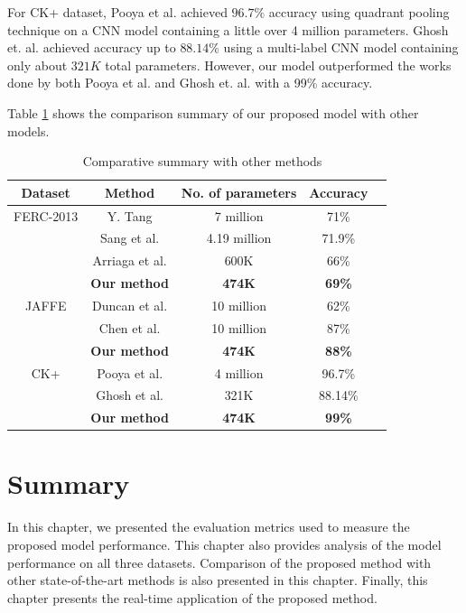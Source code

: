 \documentclass[master]{thesis-uestc}
\begin{document}
For CK+ dataset, Pooya et al.\cite{do_deep_7406361} achieved $96.7\%$ accuracy using quadrant pooling technique on a CNN model containing a little over 4 million parameters. Ghosh et. al. \cite{Ghosh_7344632} achieved accuracy up to $88.14\%$ using a multi-label CNN model containing only about $321K$ total parameters. However, our model outperformed the works done by both Pooya et al.\cite{do_deep_7406361} and Ghosh et. al. \cite{Ghosh_7344632} with a 99\% accuracy.

Table \ref{table_comparison} shows the comparison summary of our proposed model with other models. 

\begin{table}[ht]
\renewcommand{\arraystretch}{1.3}
\caption{\,\,\,\,\,Comparative summary with other methods}
\label{table_comparison}
\begin{center}
\begin{tabular}{|c|c|c|c|c|}
\hline
Dataset & Method & No. of parameters & Accuracy \\ \hline
FERC-2013 & Y. Tang\cite{tang2018} & 7 million & 71\% \\
                 & Sang et al.\cite{sang-2017} & 4.19 million & 71.9\% \\
	      & Arriaga et al.\cite{DBLP:journals/corr/abs-1710-07557} & 600K & 66\% \\
	      & \textbf{Our method} & \textbf{474K} & \textbf{69\%} \\
\hline
JAFFE & Duncan et al.\cite{duncan2016} & 10 million & 62\% \\
                 & Chen et al.\cite{7988558} & 10 million & 87\% \\
	      & \textbf{Our method} & \textbf{474K} & \textbf{88\%} \\
\hline
CK+ & Pooya et al.\cite{do_deep_7406361} & 4 million & 96.7\% \\
                 & Ghosh et al.\cite{Ghosh_7344632} & 321K & 88.14\% \\
	      & \textbf{Our method} & \textbf{474K} & \textbf{99\%} \\
\hline
\end{tabular}
\end{center}
\end{table}

\section{Summary}
In this chapter, we presented the evaluation metrics used to measure the proposed model performance. This chapter also provides analysis of the model performance on all three datasets. Comparison of the proposed method with other state-of-the-art methods is also presented in this chapter. Finally, this chapter presents the real-time application of the proposed method. 
\end{document}
